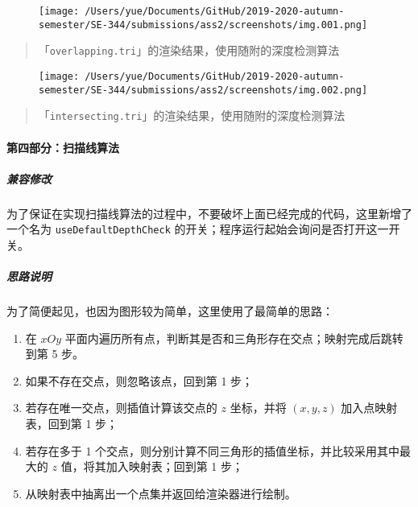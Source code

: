 \documentclass[
]{article}
\begin{document}
\begin{figure}
\centering
\texttt{[image: /Users/yue/Documents/GitHub/2019-2020-autumn-semester/SE-344/submissions/ass2/screenshots/img.001.png]}
\caption{}
\end{figure}

\begin{quote}
「\texttt{overlapping.tri}」的渲染结果，使用随附的深度检测算法
\end{quote}

\begin{figure}
\centering
\texttt{[image: /Users/yue/Documents/GitHub/2019-2020-autumn-semester/SE-344/submissions/ass2/screenshots/img.002.png]}
\caption{}
\end{figure}

\begin{quote}
「\texttt{intersecting.tri}」的渲染结果，使用随附的深度检测算法
\end{quote}

\hypertarget{header-n86}{%
\paragraph{第四部分：扫描线算法}\label{header-n86}}

\hypertarget{header-n87}{%
\subparagraph{兼容修改}\label{header-n87}}

为了保证在实现扫描线算法的过程中，不要破坏上面已经完成的代码，这里新增了一个名为
\texttt{useDefaultDepthCheck}
的开关；程序运行起始会询问是否打开这一开关。

\hypertarget{header-n89}{%
\subparagraph{思路说明}\label{header-n89}}

为了简便起见，也因为图形较为简单，这里使用了最简单的思路：

\begin{enumerate}
\def\labelenumi{\arabic{enumi}.}
\item
  在 \(xOy\)
  平面内遍历所有点，判断其是否和三角形存在交点；映射完成后跳转到第 5
  步。
\item
  如果不存在交点，则忽略该点，回到第 1 步；
\item
  若存在唯一交点，则插值计算该交点的 \(z\) 坐标，并将 \((x, y, z)\)
  加入点映射表，回到第 1 步；
\item
  若存在多于 1
  个交点，则分别计算不同三角形的插值坐标，并比较采用其中最大的 \(z\)
  值，将其加入映射表；回到第 1 步；
\item
  从映射表中抽离出一个点集并返回给渲染器进行绘制。
\end{enumerate}
\end{document}
